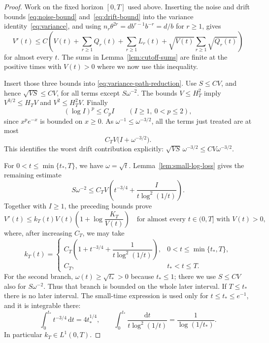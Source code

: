 \begin{proof}
Work on the fixed horizon $[0,T]$ used above.  Inserting the noise
and drift bounds \eqref{eq:noise-bound} and~\eqref{eq:drift-bound}
into the variance identity~\eqref{eq:variance}, and using
$n_r\theta^{2r}=db^{r-1}b^{-r}=d/b$ for $r\ge1$, gives
\begin{equation}
 V'(t)\le C\left(
 V(t)+\sum_{r\ge1}Q_r(t)+\sum_{r\ge1}L_r(t)
            +\sqrt{V(t)}\sum_{r\ge1}\sqrt{Q_r(t)}\right)
 \label{eq:variance-path-reduction}
\end{equation}
for almost every $t$.  The sums in Lemma~\ref{lem:cutoff-sums} are
finite at the positive times with $V(t)>0$ where we now use this
inequality.

Insert those three bounds into \eqref{eq:variance-path-reduction}.
Use $S\le CV$, and hence $\sqrt{VS}\le C V$, for all terms except
$S\omega^{-2}$.  The bounds $V\le H_T^2$ imply
$V^{3/2}\le H_TV$ and $V^2\le H_T^2V$.  Finally
\[
 (\log I)^p\le C_p I\qquad(I\ge1,\ 0<p\le2),
\]
since $x^p e^{-x}$ is bounded on $x\ge0$.  As $\omega^{-1}\le
\omega^{-3/2}$, all the terms just treated are at most
\[
 C_TV\bigl(I+\omega^{-3/2}\bigr).
\]
This identifies the worst drift contribution explicitly:
$\sqrt{VS}\,\omega^{-3/2}\le CV\omega^{-3/2}$.

For $0<t\le\min\{t_*,T\}$, we have $\omega=\sqrt t$.
Lemma~\ref{lem:small-log-loss} gives the remaining estimate
\[
 S\omega^{-2}
 \le C_TV\left(t^{-3/4}
           +\frac{I}{t\log^2(1/t)}\right).
\]
Together with $I\ge1$, the preceding bounds prove
\begin{equation}
 V'(t)\le k_T(t)V(t)
        \left(1+\log\frac{K_T}{V(t)}\right)
 \quad\text{for almost every $t\in(0,T]$ with $V(t)>0$},
 \label{eq:integrable-osgood}
\end{equation}
where, after increasing $C_T$, we may take
\begin{equation}
 k_T(t)=
 \begin{cases}
 C_T\left(1+t^{-3/4}
          +\dfrac{1}{t\log^2(1/t)}\right),&0<t\le\min\{t_*,T\},\\[2mm]
 C_T,&t_*<t\le T.
 \end{cases}
 \label{eq:osgood-coefficient}
\end{equation}
For the second branch, $\omega(t)\ge\sqrt{t_*}>0$ because
$t_*\le1$; there we use $S\le CV$ also for $S\omega^{-2}$.
Thus that branch is bounded on the whole later interval.
If $T\le t_*$ there is no later interval.  The small-time expression
is used only for $t\le t_*\le e^{-1}$, and it is integrable there:
\[
 \int_0^{t_*}t^{-3/4}\,\mathrm dt=4t_*^{1/4},\qquad
 \int_0^{t_*}\frac{\mathrm dt}{t\log^2(1/t)}
 =\frac{1}{\log(1/t_*)}.
\]
In particular $k_T\in L^1(0,T)$.


\end{proof}
